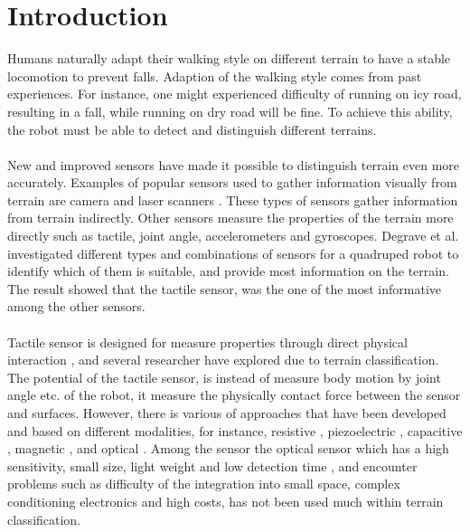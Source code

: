 \documentclass[USenglish]{ifimaster}  %
\begin{document}
\chapter{Introduction}                  %
Humans naturally adapt their walking style on different terrain to have a stable locomotion to prevent falls. Adaption of the walking style comes from past experiences. For instance, one might experienced difficulty of running on icy road, resulting in a fall, while running on dry road will be fine. To achieve this ability, the robot must be able to detect and distinguish different terrains.
\\
\\ 
New and improved sensors have made it possible to distinguish terrain even more accurately. Examples of popular sensors used to gather information visually from terrain are camera \cite{littleDog} and laser scanners \cite{4651026}. These types of sensors gather information from terrain indirectly. Other sensors measure the properties of the terrain more directly such as tactile, joint angle, accelerometers and gyroscopes. Degrave et al.\cite{6784609} investigated different types and combinations of sensors for a quadruped robot to identify which of them is suitable, and provide most information on the terrain. The result showed that the tactile sensor, was the one of the most informative among the other sensors. 
\\
\\
Tactile sensor is designed for measure properties through direct physical interaction \cite{Cutkosky2008}, and several researcher \cite{6784609,ROB:ROB20332,5752869,6584154} have explored due to terrain classification. The potential of the tactile sensor, is instead of measure body motion by joint angle etc. of the robot, it measure the physically contact force between the sensor and surfaces. However, there is various of approaches that have been developed and based on different modalities, for instance, resistive \cite{928844,4276807,Wisitsoraat200717,351572}, piezoelectric  \cite{4200745,1331377}, capacitive \cite{99980,554353}, magnetic \cite{Chi2004172}, and optical \cite{220165,20431,Nicholls1990,1545264,1381228,7559098,Heo2006312}. Among the sensor the optical sensor which has a high sensitivity, small size, light weight and low detection time \cite{Dutta2016}, and encounter problems such as difficulty of the integration into small space, complex conditioning electronics and high costs, has not been used much within terrain classification.
\\
\\
\end{document}
